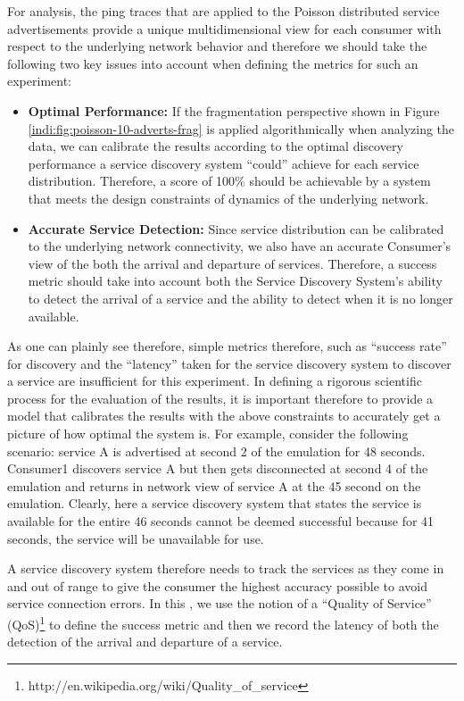 For analysis, the ping traces that are applied to the Poisson distributed service advertisements provide a unique multidimensional view for each consumer with respect to the underlying network behavior and therefore we should take the following two key issues into account when defining the metrics for such an experiment:

\begin{itemize}
\item  \textbf{Optimal Performance:}  If the fragmentation perspective shown in Figure \ref{indi:fig:poisson-10-adverts-frag} is applied algorithmically when analyzing the data, we can calibrate the results according to the optimal discovery performance a service discovery system ``could'' achieve for each service distribution. Therefore, a score of 100\% should be achievable by a system that meets the design constraints of dynamics of the underlying network.  

\item \textbf{Accurate Service Detection:}   Since service distribution can be calibrated to the underlying network connectivity, we also have an accurate Consumer's view of the both the arrival and departure of services. Therefore, a success metric should take into account both the Service Discovery System's ability to detect the arrival of a service and the ability to detect when it is no longer available.
\end{itemize}

As one can plainly see therefore, simple metrics therefore, such as ``success rate'' for discovery and the ``latency'' taken for the service discovery system to discover a service are insufficient for this experiment. In defining a rigorous scientific process for the evaluation of the results, it is important therefore to provide a model that calibrates the results with the above constraints to accurately get a picture of how optimal the system is.  For example, consider the following scenario: service A is advertised at second 2 of the emulation for 48 seconds.  Consumer1 discovers service A but then gets disconnected at second 4 of the emulation and returns in network view of service A at the 45 second on the emulation.  Clearly, here a service discovery system that states the service is available for the entire 46 seconds cannot be deemed successful because for 41 seconds, the service will be unavailable for use.   

A service discovery system therefore needs to track the services as they come in and out of range to give the consumer the highest accuracy possible to avoid service connection errors. In this \doctype, we use the notion of a ``Quality of Service'' (QoS)\footnote{http://en.wikipedia.org/wiki/Quality\_of\_service} to  define the success metric and then we record the latency of both the detection of the arrival and departure of a service.  

